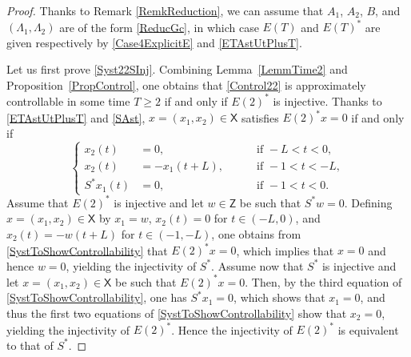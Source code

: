 \documentclass[JEP,XML,SOM,Unicode]{cedram}
\theoremstyle{plain}
\theoremstyle{definition}
\begin{document}
\begin{proof}
Thanks to Remark \ref{RemkReduction}, we can assume that $A_1$, $A_2$, $B$, and $(\Lambda_1, \Lambda_2)$ are of the form \eqref{ReducGc}, in which case $E(T)$ and $E(T)^\ast$ are given respectively by \eqref{Case4ExplicitE} and \eqref{ETAstUtPlusT}.

Let us first prove \eqref{Syst22SInj}. Combining Lemma~\ref{LemmTime2} and Proposition~\ref{PropControl}, one obtains that \eqref{Control22} is approximately controllable in some time $T \geq 2$ if and only if $E(2)^\ast$ is injective. Thanks to \eqref{ETAstUtPlusT} and \eqref{SAst}, $x = (x_1, x_2) \in \mathsf X$ satisfies $E(2)^\ast x = 0$ if and only if
\begin{equation}
\label{SystToShowControllability}
\left\{
\begin{aligned}
x_2(t) & = 0, & \quad & \text{ if } -L < t < 0, \\
x_2(t) & = -x_1(t + L) , & & \text{ if } -1 < t < -L, \\
S^\ast x_1(t) & = 0, & & \text{ if } -1 < t < 0.
\end{aligned}
\right.
\end{equation}
Assume that $E(2)^\ast$ is injective and let $w \in \mathsf Z$ be such that $S^\ast w = 0$. Defining $x = (x_1, x_2) \in \mathsf X$ by $x_1 = w$, $x_2(t) = 0$ for $t \in (-L, 0)$, and $x_2(t) = -w(t + L)$ for $t \in (-1, -L)$, one obtains from \eqref{SystToShowControllability} that $E(2)^\ast x = 0$, which implies that $x = 0$ and hence $w = 0$, yielding the injectivity of $S^\ast$. Assume now that $S^\ast$ is injective and let $x = (x_1, x_2) \in \mathsf X$ be such that $E(2)^\ast x = 0$. Then, by the third equation of \eqref{SystToShowControllability}, one has $S^\ast x_1 = 0$, which shows that $x_1 = 0$, and thus the first two equations of \eqref{SystToShowControllability} show that $x_2 = 0$, yielding the injectivity of $E(2)^\ast$. Hence the injectivity of $E(2)^\ast$ is equivalent to that of $S^\ast$.


\end{proof}
\end{document}
